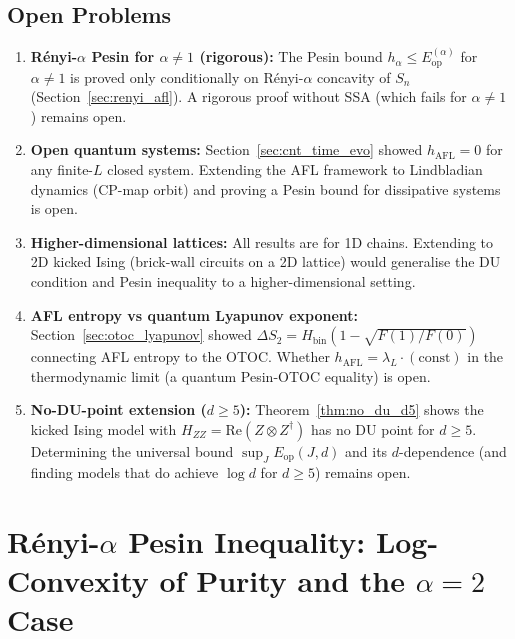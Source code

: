 \documentclass[12pt,a4paper]{article}
\begin{document}
\subsection{Open Problems}
\label{subsec:open}

\begin{enumerate}
\item \textbf{Rényi-$\alpha$ Pesin for $\alpha\neq 1$ (rigorous):}
The Pesin bound $h_\alpha\leq E_{\mathrm{op}}^{(\alpha)}$ for $\alpha\neq 1$ is proved only
conditionally on Rényi-$\alpha$ concavity of $S_n$ (Section~\ref{sec:renyi_afl}).
A rigorous proof without SSA (which fails for $\alpha\neq 1$) remains open.

\item \textbf{Open quantum systems:}
Section~\ref{sec:cnt_time_evo} showed $h_{\mathrm{AFL}}=0$ for any finite-$L$ closed system.
Extending the AFL framework to Lindbladian dynamics (CP-map orbit)
and proving a Pesin bound for dissipative systems is open.

\item \textbf{Higher-dimensional lattices:}
All results are for 1D chains. Extending to 2D kicked Ising (brick-wall circuits
on a 2D lattice) would generalise the DU condition and Pesin inequality to
a higher-dimensional setting.

\item \textbf{AFL entropy vs quantum Lyapunov exponent:}
Section~\ref{sec:otoc_lyapunov} showed $\Delta S_2=H_{\mathrm{bin}}(1-\sqrt{F(1)/F(0)})$
connecting AFL entropy to the OTOC. Whether $h_{\mathrm{AFL}}=\lambda_L\cdot(\text{const})$
in the thermodynamic limit (a quantum Pesin-OTOC equality) is open.

\item \textbf{No-DU-point extension ($d\geq 5$):}
Theorem~\ref{thm:no_du_d5} shows the kicked Ising model with $H_{ZZ}=\mathrm{Re}(Z\otimes Z^\dagger)$
has no DU point for $d\geq 5$. Determining the universal bound
$\sup_J E_{\mathrm{op}}(J,d)$ and its $d$-dependence (and finding models that do achieve $\log d$
for $d\geq 5$) remains open.
\end{enumerate}

\section{Rényi-$\alpha$ Pesin Inequality: Log-Convexity of Purity and the $\alpha=2$ Case}
\label{sec:renyi2_pesin}
\end{document}

